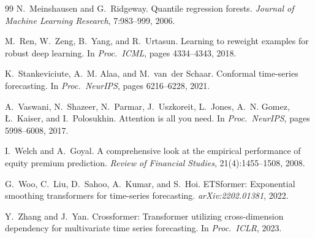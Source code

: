 \documentclass[11pt]{article}
\begin{document}
\begin{thebibliography}{99}
N.~Meinshausen and G.~Ridgeway.
Quantile regression forests.
\emph{Journal of Machine Learning Research}, 7:983--999, 2006.

M.~Ren, W.~Zeng, B.~Yang, and R.~Urtasun.
Learning to reweight examples for robust deep learning.
In \emph{Proc.\ ICML}, pages 4334--4343, 2018.

K.~Stan{k}eviciute, A.~M. Alaa, and M.~van~der Schaar.
Conformal time-series forecasting.
In \emph{Proc.\ NeurIPS}, pages 6216--6228, 2021.

A.~Vaswani, N.~Shazeer, N.~Parmar, J.~Uszkoreit, L.~Jones,
A.~N. Gomez, {\L}.~Kaiser, and I.~Polosukhin.
Attention is all you need.
In \emph{Proc.\ NeurIPS}, pages 5998--6008, 2017.

I.~Welch and A.~Goyal.
A comprehensive look at the empirical performance of equity premium prediction.
\emph{Review of Financial Studies}, 21(4):1455--1508, 2008.

G.~Woo, C.~Liu, D.~Sahoo, A.~Kumar, and S.~Hoi.
ETSformer: Exponential smoothing transformers for time-series forecasting.
\emph{arXiv:2202.01381}, 2022.

Y.~Zhang and J.~Yan.
Crossformer: Transformer utilizing cross-dimension dependency for multivariate
time series forecasting.
In \emph{Proc.\ ICLR}, 2023.

\end{thebibliography}
\end{document}
